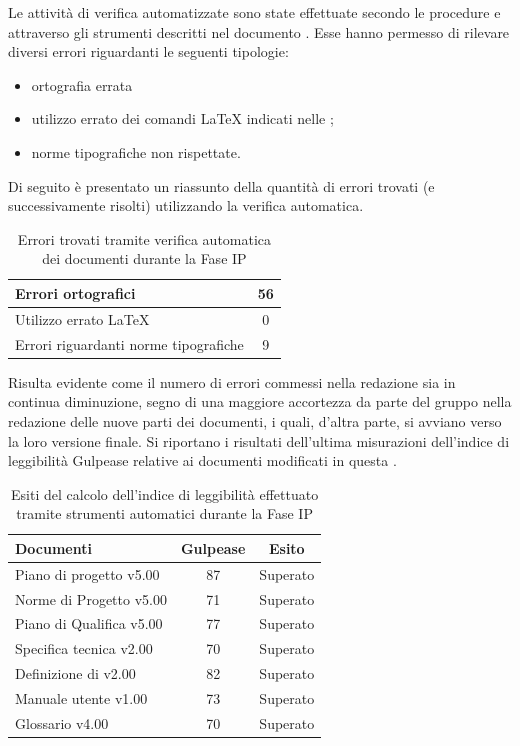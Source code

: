 	Le attività di verifica automatizzate sono state effettuate secondo le procedure e attraverso gli strumenti descritti nel documento . Esse hanno permesso di rilevare diversi errori riguardanti le seguenti tipologie:
	\begin{itemize}
	\item ortografia errata
	\item utilizzo errato dei comandi \LaTeX{} indicati nelle ;
	\item norme tipografiche non rispettate.
	\end{itemize}
	Di seguito è presentato un riassunto della quantità di errori trovati (e successivamente risolti) utilizzando la verifica automatica.
	\begin{table}[H]
		\centering
			\begin{tabu}{| l | c |}
				\hline
				Errori ortografici	& 56	\\ \hline
				Utilizzo errato \LaTeX{}	& 0	\\ \hline
				Errori riguardanti norme tipografiche	& 9	\\ \hline
			\end{tabu}
		\caption{Errori trovati tramite verifica automatica dei documenti durante la Fase IP}
	\end{table}

	Risulta evidente come il numero di errori commessi nella redazione sia in continua diminuzione, segno di una maggiore accortezza da parte del gruppo nella redazione delle nuove parti dei documenti, i quali, d'altra parte, si avviano verso la loro versione finale.
	Si riportano i risultati dell'ultima misurazioni dell'indice di leggibilità Gulpease relative ai documenti modificati in questa .

	\begin{table}[H]
		\centering
			\begin{tabu}{| l | c | c |}
				\hline
				Documenti 							& Gulpease	& Esito		\\ \hline \hline
				Piano di progetto v5.00				& 87 		& Superato  \\ \hline
				Norme di Progetto v5.00 			& 71		& Superato  \\ \hline
				Piano di Qualifica v5.00 			& 77		& Superato  \\ \hline
				Specifica tecnica v2.00				& 70		& Superato \\ \hline
				Definizione di  v2.00		& 82		& Superato \\ \hline
				Manuale utente v1.00				& 73		& Superato \\ \hline
				Glossario v4.00					 	& 70 		& Superato  \\ \hline
			\end{tabu}
		\caption{Esiti del calcolo dell'indice di leggibilità effettuato tramite strumenti automatici durante la Fase IP}
	\end{table}

